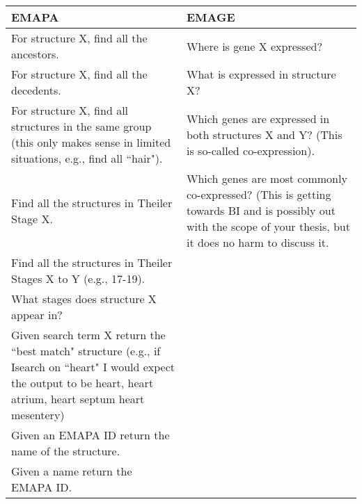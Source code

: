 \begin{center}
    \begin{tabular}{ | p{0.5\linewidth} | p{0.5\linewidth}|}
    \hline
    \textbf{EMAPA} & \textbf{EMAGE} \\ \hline
    For structure X, find all the ancestors. &  Where is gene X expressed? \\ \hline
    For structure X, find all the decedents. &  What is expressed in structure X? \\ \hline
    For structure X, find all structures in the same group (this only makes sense in limited situations, e.g., find all ``hair"). & Which genes are expressed in both structures X and Y?  (This is so-called co-expression). \\ \hline
    Find all the structures in Theiler Stage X. & Which genes are most commonly co-expressed? (This is getting towards BI and is possibly out with the scope of your thesis, but it does no harm to discuss it. \\ \hline
    Find all the structures in Theiler Stages X to Y (e.g., 17-19). &  \\ \hline
    What stages does structure X appear in? & \\ \hline
    Given search term X return the ``best match" structure (e.g., if Isearch on ``heart" I would expect the output to be heart, heart atrium, heart septum  heart mesentery) & \\ \hline
    Given an EMAPA ID return the name of the structure. &  \\ \hline
    Given a name return the EMAPA ID. &  \\ \hline
    \end{tabular}
\end{center}
\parindent 15pt






